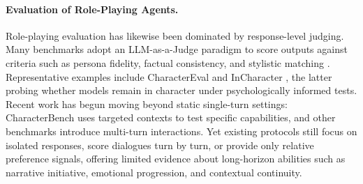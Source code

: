 \paragraph{Evaluation of Role-Playing Agents.}
Role-playing evaluation has likewise been dominated by response-level judging. Many benchmarks adopt an LLM-as-a-Judge paradigm to score outputs against criteria such as persona fidelity, factual consistency, and stylistic matching \cite{wang-etal-2024-rolellm, li2023chatharuhi}. Representative examples include CharacterEval \cite{tu-etal-2024-charactereval} and InCharacter \cite{wang-etal-2024-incharacter}, the latter probing whether models remain in character under psychologically informed tests. Recent work has begun moving beyond static single-turn settings: CharacterBench \cite{DBLP:conf/aaai/ZhouHWBCK0XPTZZ25} uses targeted contexts to test specific capabilities, and other benchmarks introduce multi-turn interactions. Yet existing protocols still focus on isolated responses, score dialogues turn by turn, or provide only relative preference signals, offering limited evidence about long-horizon abilities such as narrative initiative, emotional progression, and contextual continuity.


